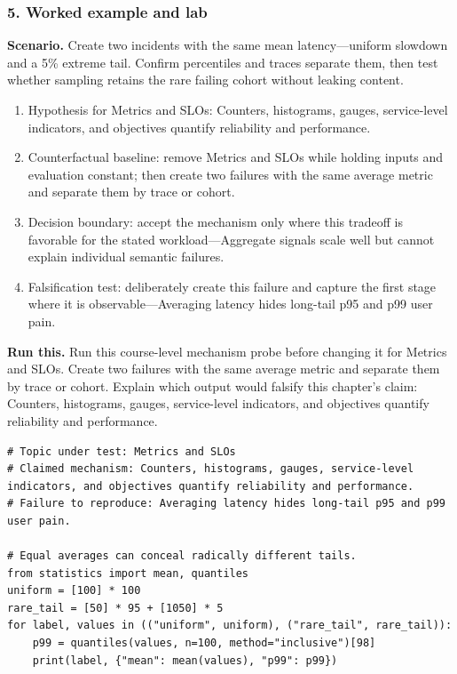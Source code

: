 \subsubsection*{5. Worked example and lab}
\textbf{Scenario.} Create two incidents with the same mean latency—uniform slowdown and a 5\% extreme tail. Confirm percentiles and traces separate them, then test whether sampling retains the rare failing cohort without leaking content.
\begin{enumerate}
\item Hypothesis for Metrics and SLOs: Counters, histograms, gauges, service-level indicators, and objectives quantify reliability and performance.
\item Counterfactual baseline: remove Metrics and SLOs while holding inputs and evaluation constant; then create two failures with the same average metric and separate them by trace or cohort.
\item Decision boundary: accept the mechanism only where this tradeoff is favorable for the stated workload—Aggregate signals scale well but cannot explain individual semantic failures.
\item Falsification test: deliberately create this failure and capture the first stage where it is observable—Averaging latency hides long-tail p95 and p99 user pain.
\end{enumerate}
\textbf{Run this.} Run this course-level mechanism probe before changing it for Metrics and SLOs. Create two failures with the same average metric and separate them by trace or cohort. Explain which output would falsify this chapter's claim: Counters, histograms, gauges, service-level indicators, and objectives quantify reliability and performance.
\begin{Verbatim}[fontsize=\scriptsize]
# Topic under test: Metrics and SLOs
# Claimed mechanism: Counters, histograms, gauges, service-level indicators, and objectives quantify reliability and performance.
# Failure to reproduce: Averaging latency hides long-tail p95 and p99 user pain.

# Equal averages can conceal radically different tails.
from statistics import mean, quantiles
uniform = [100] * 100
rare_tail = [50] * 95 + [1050] * 5
for label, values in (("uniform", uniform), ("rare_tail", rare_tail)):
    p99 = quantiles(values, n=100, method="inclusive")[98]
    print(label, {"mean": mean(values), "p99": p99})
\end{Verbatim}
